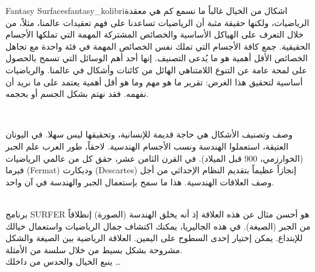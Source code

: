 \begin{surferIntroPage}{Fantasy Surfaces}{fantasy_kolibri}{اشكال من الخيال}
غالباً ما نسمع كم هي معقدة الرياضيات، ولكنها حقيقة مثبة أن الرياضيات تساعدنا على فهم تعقيدات عالمنا، مثلاً، من خلال التعرف على الهياكل الأساسية والخصائص المشتركة المهمة التي تملكها الأجسام الحقيقية. جمع كافة الأجسام التي تملك نفس الخصائص المهمة في فئة واحدة مع تجاهل الخصائص الأقل أهمية هو ما يُدعى التصنيف. إنها أحد أهم الوسائل التي تسمح بالحصول على لمحة عامة عن التنوع اللامتناهي الهائل من كائنات وأشكال في عالمنا. والرياضيات أساسية لتحقيق هذا الغرض: تقرير ما هو مهم وما هو أقل أهمية يعتمد على ما نريد أن نفهمه. فقد نهتم بشكل الجسم أو بحجمه.
 
\\

\vspace{0.4cm}

وصف وتصنيف الأشكال هي حاجة قديمة للإنسانية، وتحقيقها ليس سهلا. في اليونان العتيقة، استعملوا الهندسة ونسب الأجسام الهندسية. لاحقاً، طور العرب علم الجبر (الخوارزمي، 900 قبل الميلاد). في القرن الثامن عشر، حقق كل من عالمي الرياضيات فيرما (Fermat) وديكارت (Descartes) إنجازاً عظيماً بتقديم النظام الإحداثي من أجل وصف العلاقات الهندسية. هذا ما سمح بإستعمال الجبر والهندسة في آن واحد.

\\
\vspace{0.4cm}
برنامج SURFER هو أحسن مثال عن هذه العلاقة إذ أنه يخلق الهندسة (الصورة) إنطلاقاً من الجبر (الصيغة).
في هذه الجاليريا، يمكنك اكتشاف جمال الرياضيات واستعمال خيالك للإبتداع. يمكن إختيار إحدى السطوح على اليمين. العلاقة الرياضية بين الصيغة والشكل مشروحة بشكل بسيط من خلال سلسة من الأمثلة.\\
ينبع الخيال والحدس من داخلك \dots
\end{surferIntroPage}